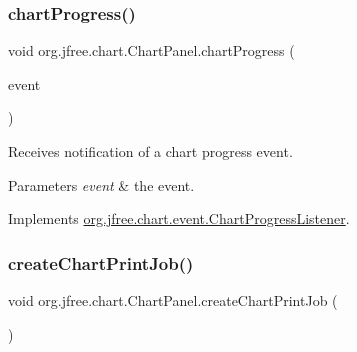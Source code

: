 \mbox{\label{classorg_1_1jfree_1_1chart_1_1_chart_panel_ab523b864bdd86dbe34cbc9c39a8b3763}} 
\subsubsection{\texorpdfstring{chart\+Progress()}{chartProgress()}}
{\footnotesize\ttfamily void org.\+jfree.\+chart.\+Chart\+Panel.\+chart\+Progress (\begin{DoxyParamCaption}\item[{\mbox{\hyperlink{classorg_1_1jfree_1_1chart_1_1event_1_1_chart_progress_event}{Chart\+Progress\+Event}}}]{event }\end{DoxyParamCaption})}

Receives notification of a chart progress event.


\begin{DoxyParams}{Parameters}
{\em event} & the event. \\
\hline
\end{DoxyParams}


Implements \mbox{\hyperlink{interfaceorg_1_1jfree_1_1chart_1_1event_1_1_chart_progress_listener_ac76c2d68a45af7a6a97aaf9998259eab}{org.\+jfree.\+chart.\+event.\+Chart\+Progress\+Listener}}.

\mbox{\label{classorg_1_1jfree_1_1chart_1_1_chart_panel_a054bf4da46d0694089b820c8032d3812}} 
\subsubsection{\texorpdfstring{create\+Chart\+Print\+Job()}{createChartPrintJob()}}
{\footnotesize\ttfamily void org.\+jfree.\+chart.\+Chart\+Panel.\+create\+Chart\+Print\+Job (\begin{DoxyParamCaption}{ }\end{DoxyParamCaption})}

